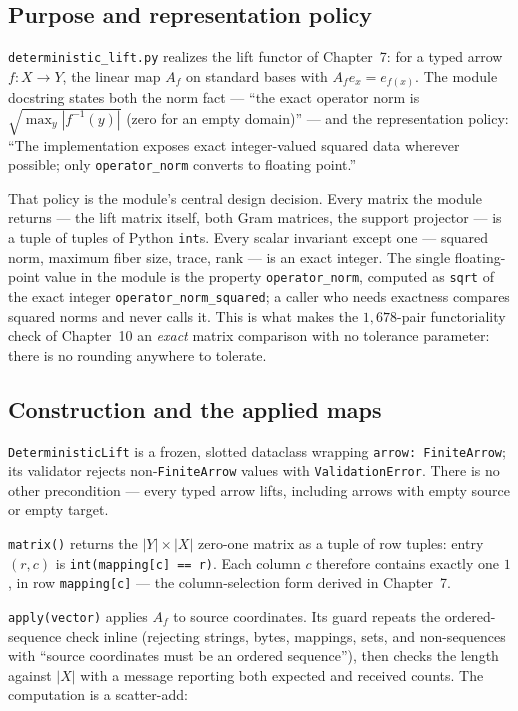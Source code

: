 \subsection{Purpose and representation policy}

\texttt{deterministic\_lift.py} realizes the lift functor of Chapter~7: for
a typed arrow $f : X \to Y$, the linear map $A_f$ on standard bases with
$A_f e_x = e_{f(x)}$. The module docstring states both the norm fact ---
``the exact operator norm is $\sqrt{\max_y |f^{-1}(y)|}$ (zero for an empty
domain)'' --- and the representation policy: ``The implementation exposes
exact integer-valued squared data wherever possible; only
\texttt{operator\_norm} converts to floating point.''

That policy is the module's central design decision. Every matrix the
module returns --- the lift matrix itself, both Gram matrices, the support
projector --- is a tuple of tuples of Python \texttt{int}s. Every scalar
invariant except one --- squared norm, maximum fiber size, trace, rank ---
is an exact integer. The single floating-point value in the module is the
property \texttt{operator\_norm}, computed as \texttt{sqrt} of the exact
integer \texttt{operator\_norm\_squared}; a caller who needs exactness
compares squared norms and never calls it. This is what makes the
$1{,}678$-pair functoriality check of Chapter~10 an \emph{exact} matrix
comparison with no tolerance parameter: there is no rounding anywhere to
tolerate.

\subsection{Construction and the applied maps}

\begin{construction}\label{ch09:con:lift}
\texttt{DeterministicLift} is a frozen, slotted dataclass wrapping
\texttt{arrow: FiniteArrow}; its validator rejects non-\texttt{FiniteArrow}
values with \texttt{ValidationError}. There is no other precondition ---
every typed arrow lifts, including arrows with empty source or empty
target.
\end{construction}

\texttt{matrix()} returns the $|Y| \times |X|$ zero-one matrix as a tuple
of row tuples: entry $(r, c)$ is \texttt{int(mapping[c] == r)}. Each column
$c$ therefore contains exactly one $1$, in row \texttt{mapping[c]} --- the
column-selection form derived in Chapter~7.

\texttt{apply(vector)} applies $A_f$ to source coordinates. Its guard
repeats the ordered-sequence check inline (rejecting strings, bytes,
mappings, sets, and non-sequences with ``source coordinates must be an
ordered sequence''), then checks the length against $|X|$ with a message
reporting both expected and received counts. The computation is a
scatter-add:

